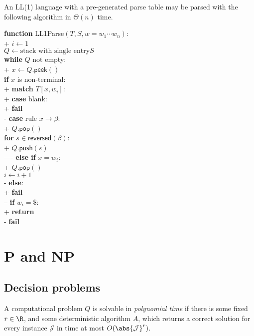 \documentclass{article}
\begin{document}
\begin{theorem}
	An LL(1) language with a pre-generated parse table may be
	parsed with the following algorithm in $\Theta(n)$ time.

	\begin{pseudo}
		\textbf{function} \textsf{LL1Parse}$(T, S, w=w_1\cdots w_n)$:		\\+
		$i \leftarrow 1$												\\
		$Q \leftarrow\text{stack with single entry$S$}$					\\
		\textbf{while} $Q$ not empty:									\\+
		$x\leftarrow Q.\textsf{peek}()$								\\
		\textbf{if} $x$ is non-terminal:							\\+
		\textbf{match} $T[x,w_i]$:								\\+
		\textbf{case} blank:								\\+
		\textbf{fail}									\\-
		\textbf{case} rule $x\to\beta$:						\\+
		$Q.\textsf{pop}()$								\\
		\textbf{for} $s\in\textsf{reversed}(\beta)$:	\\+
		$Q.\textsf{push}(s)$						\\----
		\textbf{else if} $x = w_i$:									\\+
		$Q.\textsf{pop}()$										\\
		$i\leftarrow i+1$										\\-
		\textbf{else}:												\\+
		\textbf{fail}											\\--
		\textbf{if} $w_i=\$$:											\\+
		\textbf{return}												\\-
		\textbf{fail}
	\end{pseudo}
\end{theorem}

\section{P and NP}

\subsection{Decision problems}

\begin{definition}
	A computational problem $Q$ is solvable in \emph{polynomial
		time} if there is some fixed $r\in\R$, and some deterministic
	algorithm $A$, which returns a correct solution for every
	instance $\mathcal{J}$ in time at most $O(\abs{\mathcal{J}}^r)$.
\end{definition}
\end{document}
